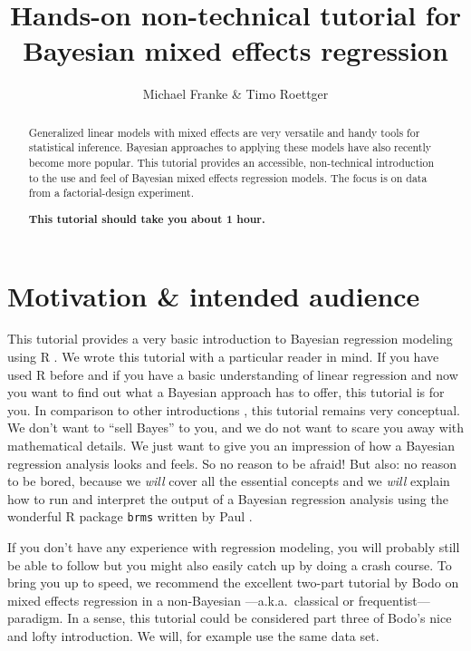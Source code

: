 \documentclass[nobib]{tufte-handout}
\title{Hands-on non-technical tutorial for Bayesian mixed effects regression}
\author{Michael Franke \& Timo Roettger}
\date{}
\begin{document}
\maketitle

\begin{abstract}
  \noindent Generalized linear models with mixed effects are very versatile and handy tools for statistical inference. Bayesian approaches to applying these models have also recently become more popular. This tutorial provides an accessible, non-technical introduction to the use and feel of Bayesian mixed effects regression models. The focus is on data from a factorial-design experiment. \\
  
  \medskip
  
  \noindent \textbf{This tutorial should take you about 1 hour.}
\end{abstract}

\section{Motivation \& intended audience}

This tutorial provides a very basic introduction to Bayesian regression modeling using R \citep{Manual}. We wrote this tutorial with a particular reader in mind. If you have used R before and if you have a basic understanding of linear regression and now you want to find out what a Bayesian approach has to offer, this tutorial is for you. In comparison to other introductions \citep[e.g.][]{SorensenHohensteinb2016:Bayesian-linear}, this tutorial remains very conceptual. We don’t want to ``sell Bayes'' to you, and we do not want to scare you away with mathematical details. We just want to give you an impression of how a Bayesian regression analysis looks and feels. So no reason to be afraid! But also: no reason to be bored, because we \emph{will} cover all the essential concepts and we \emph{will} explain how to run and interpret the output of a Bayesian regression analysis using the wonderful R package \texttt{brms} written by Paul \citep{buerkner2016brms}.

If you don’t have any experience with regression modeling, you will probably still be able to follow but you might also easily catch up by doing a crash course. To bring you up to speed, we recommend the excellent two-part tutorial by Bodo \citep{Winter2013:Linear-models-a} on mixed effects regression in a non-Bayesian ---a.k.a.~classical or frequentist--- paradigm. In a sense, this tutorial could be considered part three of Bodo's nice and lofty introduction. We will, for example use the same data set.
\end{document}
